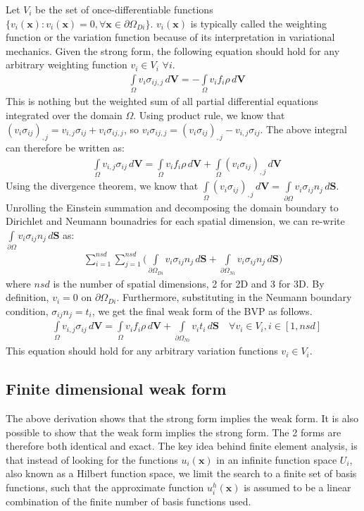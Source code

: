 	Let $V_i$ be the set of once-differentiable functions $\{v_i(\bm{x}): v_i(\bm{x}) = 0, \forall \bm{x} \in \partial \Omega_{Di}\}$. $v_i(\bm{x})$ is typically called the weighting function or the variation function because of its interpretation in variational mechanics. Given the strong form, the following equation should hold for any arbitrary weighting function $v_i \in V_i$ $\forall i$.
	\begin{align}
		& \int\limits_{\Omega} v_i\sigma_{ij,j} \,d\bm{V} = -\int\limits_{\Omega} v_i f_i \rho\,d\bm{V}
	\end{align}
	This is nothing but the weighted sum of all partial differential equations integrated over the domain $\Omega$. Using product rule, we know that $(v_i\sigma_{ij})_{,j} = v_{i,j}\sigma_{ij} + v_i\sigma_{ij,j}$, so $v_i\sigma_{ij,j} = (v_i\sigma_{ij})_{,j} - v_{i,j}\sigma_{ij}$. The above integral can therefore be written as:
	\begin{align}
		& \int\limits_{\Omega} v_{i,j}\sigma_{ij} \,d\bm{V} = \int\limits_{\Omega} v_i f_i \rho\,d\bm{V} + \int\limits_{\Omega} (v_i\sigma_{ij})_{,j} \,d\bm{V}
	\end{align}
	Using the divergence theorem, we know that $\int\limits_{\Omega} (v_i\sigma_{ij})_{,j} \,d\bm{V} = \int\limits_{\partial \Omega} v_i\sigma_{ij}n_j \,d\bm{S}$. Unrolling the Einstein summation and decomposing the domain boundary to Dirichlet and Neumann bounadries for each spatial dimension, we can re-write $\int\limits_{\partial \Omega} v_i\sigma_{ij}n_j \,d\bm{S}$ as:
	\begin{align}
        \sum_{i=1}^{nsd}\sum_{j=1}^{nsd}\Bigg(\int\limits_{\partial \Omega_{Di}} v_i\sigma_{ij}n_j \,d\bm{S} + \int\limits_{\partial \Omega_{Ni}} v_i\sigma_{ij}n_j \,d\bm{S}\Bigg)
	\end{align}
	where $nsd$ is the number of spatial dimensions, 2 for 2D and 3 for 3D. By definition, $v_i = 0$ on $\partial \Omega_{Di}$. Furthermore, substituting in the Neumann boundary condition, $\sigma_{ij}n_j = t_i$, we get the final weak form of the BVP as follows.
	\begin{align}
		& \int\limits_{\Omega} v_{i,j}\sigma_{ij} \,d\bm{V} = \int\limits_{\Omega} v_i f_i \rho\,d\bm{V} + \int\limits_{\partial \Omega_{Ni}} v_it_i \,d\bm{S} \quad \forall v_i \in V_i, i \in [1,nsd]
	\end{align}
	This equation should hold for any arbitrary variation functions $v_i \in V_i$.

\subsection{Finite dimensional weak form}
	The above derivation shows that the strong form implies the weak form. It is also possible to show that the weak form implies the strong form. The 2 forms are therefore both identical and exact. The key idea behind finite element analysis, is that instead of looking for the functions $u_i(\bm{x})$ in an infinite function space $U_i$, also known as a Hilbert function space, we limit the search to a finite set of basis functions, such that the approximate function $u^h_i(\bm{x})$ is assumed to be a linear combination of the finite number of basis functions used.

